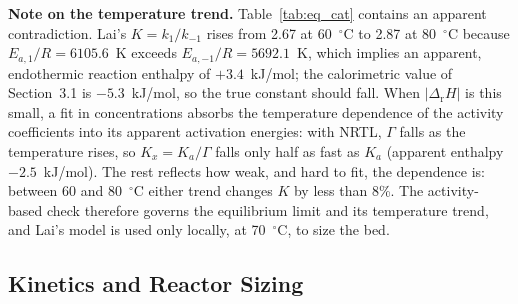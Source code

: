 \documentclass[10pt,a4paper]{article}
\begin{document}
\textbf{Note on the temperature trend.} Table~\ref{tab:eq_cat} contains an apparent contradiction. Lai's $K = k_1/k_{-1}$ rises from 2.67 at 60~$^\circ$C to 2.87 at 80~$^\circ$C because $E_{a,1}/R = 6105.6$~K exceeds $E_{a,-1}/R = 5692.1$~K, which implies an apparent, endothermic reaction enthalpy of $+3.4$~kJ/mol; the calorimetric value of Section~3.1 is $-5.3$~kJ/mol, so the true constant should fall. When $|\Delta_{\mathrm{r}}H|$ is this small, a fit in concentrations absorbs the temperature dependence of the activity coefficients into its apparent activation energies: with NRTL, $\Gamma$ falls as the temperature rises, so $K_x = K_a/\Gamma$ falls only half as fast as $K_a$ (apparent enthalpy $-2.5$~kJ/mol). The rest reflects how weak, and hard to fit, the dependence is: between 60 and 80~$^\circ$C either trend changes $K$ by less than 8\%. The activity-based check therefore governs the equilibrium limit and its temperature trend, and Lai's model is used only locally, at 70~$^\circ$C, to size the bed.

\subsection{Kinetics and Reactor Sizing}
\label{sec:kinetics}
\end{document}
